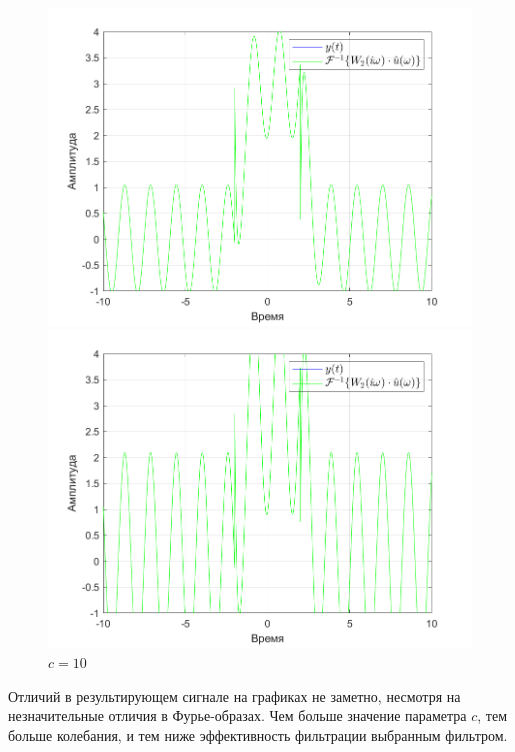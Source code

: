 \documentclass[a4paper]{article}
\begin{document}
\begin{figure}[H]
    \begin{minipage}{0.5\textwidth}
        \centering
        \includegraphics[width=\linewidth]{ex1_2/a1=0_a2=25_b1=10.5_b2=25_d=4_c=5/h3.png}
        \caption{$c=5$}
    \end{minipage}
    \begin{minipage}{0.5\textwidth}
        \centering
        \includegraphics[width=\linewidth]{ex1_2/a1=0_a2=25_b1=10.5_b2=25_d=4_c=10/h3.png}
        \caption{$c=10$}
    \end{minipage}
\end{figure}

Отличий в результирующем сигнале на графиках не заметно, несмотря на незначительные отличия в Фурье-образах. Чем больше значение параметра $c$, тем больше колебания, и тем ниже эффективность фильтрации выбранным фильтром.
\end{document}
